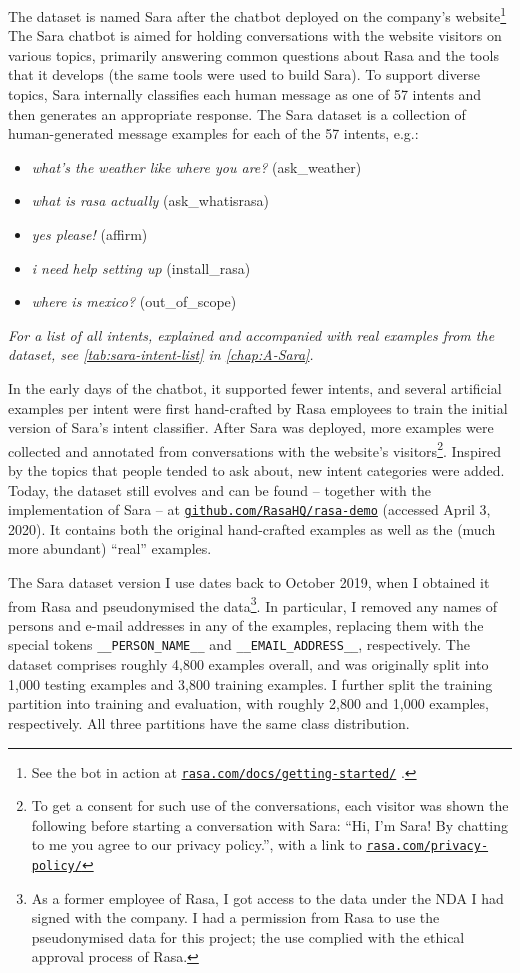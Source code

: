 \documentclass[bsc,frontabs,singlespacing,parskip,deptreport]{infthesis}
\newcommand\rurl[1]{%
  \href{https://#1}{\nolinkurl{#1}}%
}
\begin{document}
{{{      The dataset is named Sara after the chatbot deployed on the company's website\footnote{See the bot in action at \rurl{rasa.com/docs/getting-started/}.}
      The Sara chatbot is aimed for holding conversations with the website visitors on various topics, primarily answering common questions about Rasa and the tools that it develops (the same tools were used to build Sara).
      To support diverse topics, Sara internally classifies each human message as one of 57 intents and then generates an appropriate response. The Sara dataset is a collection of human-generated message examples for each of the 57 intents, e.g.:
      \begin{itemize}
        \item \textit{what's the weather like where you are?} (ask\_weather)
        \item \textit{what is rasa actually} (ask\_whatisrasa)
        \item \textit{yes please!} (affirm)
        \item \textit{i need help setting up} (install\_rasa)
        \item \textit{where is mexico?} (out\_of\_scope)
      \end{itemize}
      \textit{For a list of all intents, explained and accompanied with real examples from the dataset, see \autoref{tab:sara-intent-list} in \autoref{chap:A-Sara}.}

      In the early days of the chatbot, it supported fewer intents, and several artificial examples per intent were first hand-crafted by Rasa employees to train the initial version of Sara's intent classifier. After Sara was deployed, more examples were collected and annotated from conversations with the website's visitors\footnote{To get a consent for such use of the conversations, each visitor was shown the following before starting a conversation with Sara: ``Hi, I'm Sara! By chatting to me you agree to our privacy policy.'', with a link to \rurl{rasa.com/privacy-policy/}}. Inspired by the topics that people tended to ask about, new intent categories were added. Today, the dataset still evolves and can be found -- together with the implementation of Sara -- at \rurl{github.com/RasaHQ/rasa-demo} (accessed April 3, 2020). It contains both the original hand-crafted examples as well as the (much more abundant) ``real'' examples.

      The Sara dataset version I use dates back to October 2019, when I obtained it from Rasa and pseudonymised the data\footnote{As a former employee of Rasa, I got access to the data under the NDA I had signed with the company. I had a permission from Rasa to use the pseudonymised data for this project; the use complied with the ethical approval process of Rasa.}. In particular, I removed any names of persons and e-mail addresses in any of the examples, replacing them with the special tokens \verb|__PERSON_NAME__| and \verb|__EMAIL_ADDRESS__|, respectively.      
      The dataset comprises roughly 4,800 examples overall, and was originally split into 1,000 testing examples and 3,800 training examples. 
      I further split the training partition into training and evaluation, with roughly 2,800 and 1,000 examples, respectively. All three partitions have the same class distribution.

}}}
\end{document}

